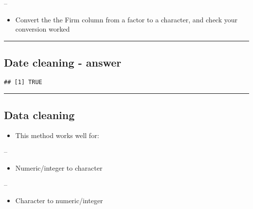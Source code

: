 \documentclass[]{article}
\newenvironment{Shaded}{\begin{snugshade}}{\end{snugshade}}
\newcommand{\KeywordTok}[1]{\textcolor[rgb]{0.13,0.29,0.53}{\textbf{#1}}}
\newcommand{\NormalTok}[1]{#1}
\newcommand{\OperatorTok}[1]{\textcolor[rgb]{0.81,0.36,0.00}{\textbf{#1}}}
\newcommand{\StringTok}[1]{\textcolor[rgb]{0.31,0.60,0.02}{#1}}
\providecommand{\tightlist}{%
  \setlength{\itemsep}{0pt}\setlength{\parskip}{0pt}}
\begin{document}
--

\begin{itemize}
\tightlist
\item
  Convert the the Firm column from a factor to a character, and check
  your conversion worked
\end{itemize}

\begin{center}\rule{0.5\linewidth}{\linethickness}\end{center}

\hypertarget{date-cleaning---answer}{%
\subsection{Date cleaning - answer}\label{date-cleaning---answer}}

\begin{Shaded}
\end{Shaded}

\begin{verbatim}
## [1] TRUE
\end{verbatim}

\begin{center}\rule{0.5\linewidth}{\linethickness}\end{center}

\hypertarget{data-cleaning-4}{%
\subsection{Data cleaning}\label{data-cleaning-4}}

\begin{itemize}
\tightlist
\item
  This method works well for:
\end{itemize}

--

\begin{itemize}
\tightlist
\item
  Numeric/integer to character
\end{itemize}

--

\begin{itemize}
\tightlist
\item
  Character to numeric/integer
\end{itemize}
\end{document}
